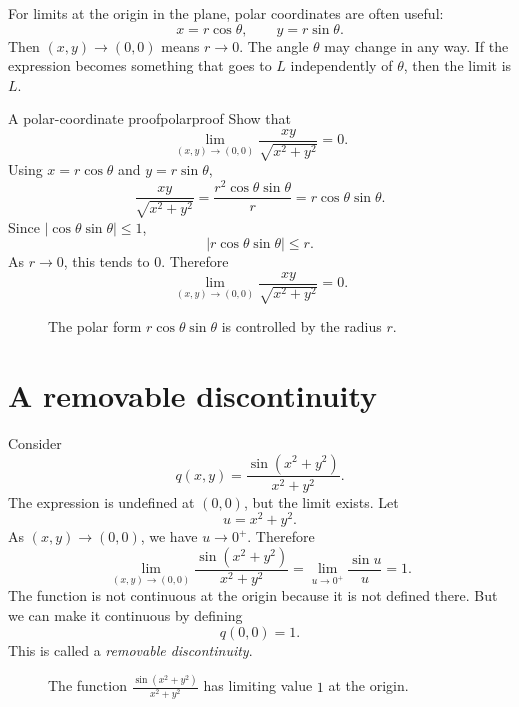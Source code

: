 \documentclass[11pt]{article}
\newcommand{\abs}[1]{\left\lvert #1\right\rvert}
\begin{document}
For limits at the origin in the plane, polar coordinates are often useful:
\[
x=r\cos\theta, \qquad y=r\sin\theta.
\]
Then $(x,y)\to(0,0)$ means $r\to0$. The angle $\theta$ may change in any way. If the expression becomes something that goes to $L$ independently of $\theta$, then the limit is $L$.

\begin{workedexample}{A polar-coordinate proof}{polarproof}
Show that
\[
\lim_{(x,y)\to(0,0)} \frac{xy}{\sqrt{x^2+y^2}}=0.
\]
Using $x=r\cos\theta$ and $y=r\sin\theta$,
\[
\frac{xy}{\sqrt{x^2+y^2}}
=
\frac{r^2\cos\theta\sin\theta}{r}
=
r\cos\theta\sin\theta.
\]
Since $\abs{\cos\theta\sin\theta}\le1$,
\[
\abs{r\cos\theta\sin\theta}\le r.
\]
As $r\to0$, this tends to $0$. Therefore
\[
\lim_{(x,y)\to(0,0)} \frac{xy}{\sqrt{x^2+y^2}}=0.
\]
\end{workedexample}

\begin{figure}[H]
\centering
{}
\caption{The polar form $r\cos\theta\sin\theta$ is controlled by the radius $r$.}
\end{figure}

\section{A removable discontinuity}

Consider
\[
q(x,y)=\frac{\sin(x^2+y^2)}{x^2+y^2}.
\]
The expression is undefined at $(0,0)$, but the limit exists. Let
\[
u=x^2+y^2.
\]
As $(x,y)\to(0,0)$, we have $u\to0^+$. Therefore
\[
\lim_{(x,y)\to(0,0)} \frac{\sin(x^2+y^2)}{x^2+y^2}
=
\lim_{u\to0^+}\frac{\sin u}{u}=1.
\]
The function is not continuous at the origin because it is not defined there. But we can make it continuous by defining
\[
q(0,0)=1.
\]
This is called a \emph{removable discontinuity}.

\begin{figure}[H]
\centering
{}
\caption{The function $\frac{\sin(x^2+y^2)}{x^2+y^2}$ has limiting value $1$ at the origin.}
\end{figure}
\end{document}
